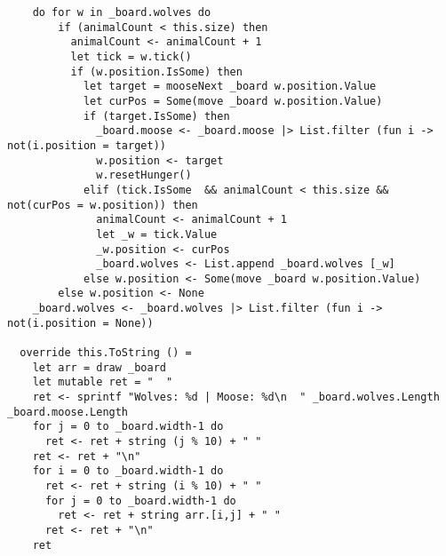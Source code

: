 \begin{lstlisting}
    do for w in _board.wolves do
        if (animalCount < this.size) then
          animalCount <- animalCount + 1
          let tick = w.tick()
          if (w.position.IsSome) then
            let target = mooseNext _board w.position.Value
            let curPos = Some(move _board w.position.Value)
            if (target.IsSome) then
              _board.moose <- _board.moose |> List.filter (fun i -> not(i.position = target))
              w.position <- target
              w.resetHunger()
            elif (tick.IsSome  && animalCount < this.size && not(curPos = w.position)) then
              animalCount <- animalCount + 1
              let _w = tick.Value
              _w.position <- curPos
              _board.wolves <- List.append _board.wolves [_w]
            else w.position <- Some(move _board w.position.Value)
        else w.position <- None
    _board.wolves <- _board.wolves |> List.filter (fun i -> not(i.position = None))

  override this.ToString () =
    let arr = draw _board
    let mutable ret = "  "
    ret <- sprintf "Wolves: %d | Moose: %d\n  " _board.wolves.Length _board.moose.Length
    for j = 0 to _board.width-1 do
      ret <- ret + string (j % 10) + " "
    ret <- ret + "\n"
    for i = 0 to _board.width-1 do
      ret <- ret + string (i % 10) + " "
      for j = 0 to _board.width-1 do
        ret <- ret + string arr.[i,j] + " "
      ret <- ret + "\n"
    ret
\end{lstlisting}

